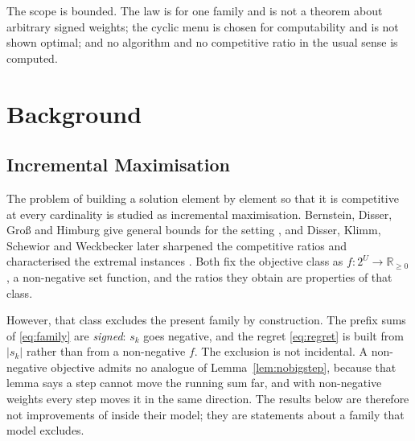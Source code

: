 \documentclass[conference]{IEEEtran}
\theoremstyle{definition}
\begin{document}
The scope is bounded. The law is for one family and is not a theorem about arbitrary signed
weights; the cyclic menu is chosen for computability and is not shown optimal; and no
algorithm and no competitive ratio in the usual sense is computed.

\section{Background}

\subsection{Incremental Maximisation}

The problem of building a solution element by element so that it is competitive at every
cardinality is studied as incremental maximisation. Bernstein, Disser, Gro\ss{} and Himburg
give general bounds for the setting \cite{bernstein2017}, and Disser, Klimm, Schewior and
Weckbecker later sharpened the competitive ratios and characterised the extremal instances
\cite{disser2023}. Both fix the objective class as $f:2^{U}\to\mathbb{R}_{\ge0}$, a
non-negative set function, and the ratios they obtain are properties of that class.

However, that class excludes the present family by construction. The prefix sums of
\eqref{eq:family} are \emph{signed}: $s_{k}$ goes negative, and the regret \eqref{eq:regret}
is built from $|s_{k}|$ rather than from a non-negative $f$. The exclusion is not incidental.
A non-negative objective admits no analogue of Lemma~\ref{lem:nobigstep}, because that lemma
says a step cannot move the running sum far, and with non-negative weights every step moves
it in the same direction. The results below are therefore not improvements of
\cite{bernstein2017,disser2023} inside their model; they are statements about a family that
model excludes.
\end{document}

